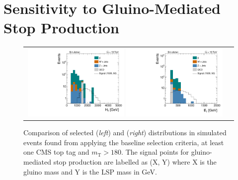 \section{Sensitivity to Gluino-Mediated Stop Production}
\label{sec:stop_gluinos}
\begin{figure}[!t]
  \centering
  \begin{tabular}{cc}
   
      \includegraphics[width=0.49\textwidth]{figures/Stop_TopTagTransverseMass_HThad_GluinoT1tttt.pdf}  
      \includegraphics[width=0.49\textwidth]{figures/Stop_TopTagTransverseMass_MET_GluinoT1tttt.pdf} 
    \end{tabular}
 
  \caption{Comparison of selected \HT (\textit{left}) and \met (\textit{right}) distributions in simulated events found from applying the baseline selection criteria, at least one CMS top tag and $m_\mathrm{T} > 180$\gev. The signal points for gluino-mediated stop production are labelled as (X, Y) where X is the gluino mass and Y is the LSP mass in GeV.}
  \label{fig:stop_gluinos_ht_met}
\end{figure}
